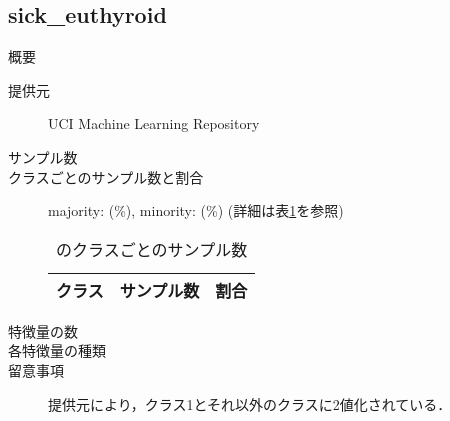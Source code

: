 \subsection{sick\_euthyroid}
\begin{description}
    \item[概要] \cite{}
    \item[提供元] UCI Machine Learning Repository
    \item[サンプル数] 
    \item[クラスごとのサンプル数と割合] majority:  (\%), minority:  (\%) (詳細は表\ref{tab:}を参照)

        \begin{table}
            \centering
            \caption{のクラスごとのサンプル数}
            \label{tab:}
            \begin{tabular}{lrc} \hline
                \multicolumn{1}{c}{クラス}&
                \multicolumn{1}{c}{サンプル数}&
                \multicolumn{1}{c}{割合}\\
                \hline
                \hline

                \hline
            \end{tabular}
        \end{table}

    \item[特徴量の数] 
    \item[各特徴量の種類] \mbox{}
        
    \item[留意事項] 提供元により，クラス1とそれ以外のクラスに2値化されている．
\end{description}


